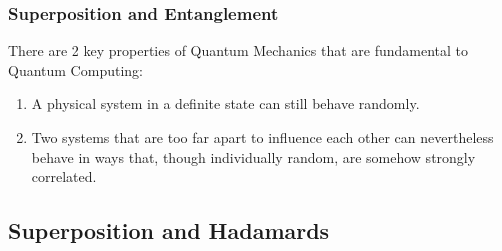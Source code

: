 \documentclass[aspectratio=169,11pt,hyperref={colorlinks=true}]{beamer}
\begin{document}
\begin{frame}
    \frametitle{Superposition and Entanglement}
    There are 2 key properties of Quantum Mechanics that are fundamental to
    Quantum Computing:
    \begin{enumerate}
        \item A physical system in a definite state can still behave randomly.
        \item Two systems that are too far apart to influence each other can
              nevertheless behave in ways that, though individually random,
              are somehow strongly correlated.
    \end{enumerate}
\end{frame}

\subsection{Superposition and Hadamards}
\end{document}
